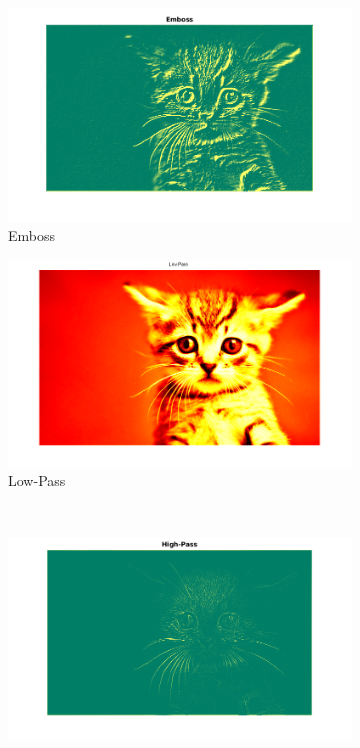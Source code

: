 \documentclass[12pt]{amsart}
\theoremstyle{definition}
\theoremstyle{remark}
\numberwithin{thm}{section}
\begin{document}
\begin{figure}[htb]
\begin{subfigure}[t]{0.2\textwidth}
\includegraphics[scale=.15]{boss_kitty1.png}
\caption{Emboss}
\end{subfigure}
\begin{subfigure}[t]{0.3\textwidth}
\includegraphics[scale=.125]{LP_Kitten.png}
\caption{Low-Pass}
\end{subfigure}
\\
\begin{subfigure}[t]{0.3\textwidth}
\includegraphics[scale=.15]{HP_kitty1.png}

\end{subfigure}
\end{figure}
\end{document}
